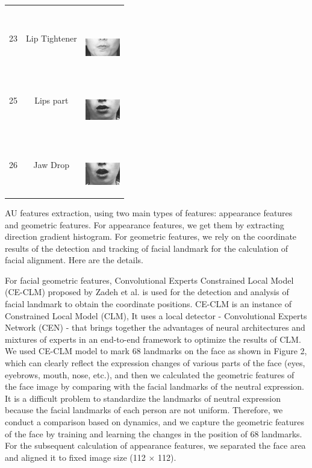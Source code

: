 \documentclass[10pt, conference, compsocconf]{IEEEtran}
\begin{document}
\begin{table}
\begin{tabular}{ccl}
\begin{minipage} {0.1\textwidth}
		\end{minipage}\\
		23 & Lip Tightener & \ \ \ \begin{minipage} {0.1\textwidth}   
			\includegraphics[width=0.6in]{AUimage/AU23.png}  
		\end{minipage}\\
		25 & Lips part & \ \ \ \begin{minipage} {0.1\textwidth}   
			\includegraphics[width=0.6in]{AUimage/AU25.png}  
		\end{minipage}\\
		26 & Jaw Drop & \ \ \ \begin{minipage} {0.1\textwidth}   
			\includegraphics[width=0.6in]{AUimage/AU26.png}  
		\end{minipage}\\
		\bottomrule
	\end{tabular}
\end{table}
AU features extraction, using two main types of features: appearance features and geometric features. For appearance features, we get them by extracting direction gradient histogram. For geometric features, we rely on the coordinate results of the detection and tracking of facial landmark for the calculation of facial alignment. Here are the details.

For facial geometric features, Convolutional Experts Constrained Local Model (CE-CLM) proposed by Zadeh\cite{zadeh2017convolutional} et al. is used for the detection and analysis of facial landmark to obtain the coordinate positions. CE-CLM is an instance of Constrained Local Model (CLM)\cite{Cristinacce2006Feature}, It uses a local detector - Convolutional Experts Network (CEN) - that brings together the advantages of neural architectures and mixtures of experts in an end-to-end framework to optimize the results of CLM. We used CE-CLM model to mark 68 landmarks on the face as shown in Figure 2, which can clearly reflect the expression changes of various parts of the face (eyes, eyebrows, mouth, nose, etc.), and then we calculated the geometric features of the face image by comparing with the facial landmarks of the neutral expression. It is a difficult problem to standardize the landmarks of neutral expression because the facial landmarks of each person are not uniform. Therefore, we conduct a comparison based on dynamics, and we capture the geometric features of the face by training and learning the changes in the position of 68 landmarks. For the subsequent calculation of appearance features, we separated the face area and aligned it to fixed image size (112 $\times$ 112).
\end{document}
